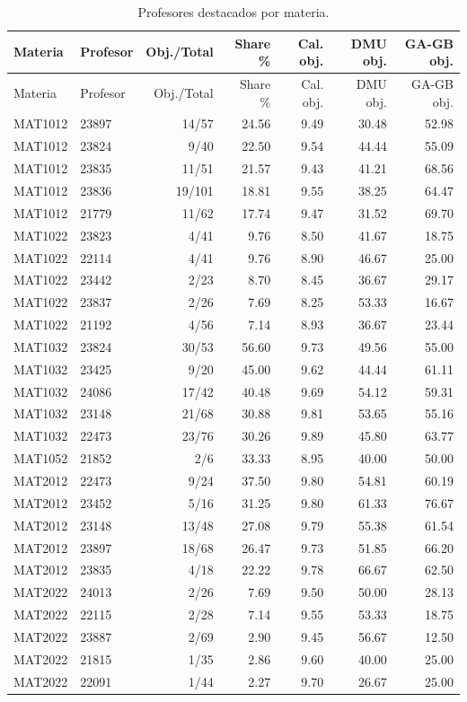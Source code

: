 \documentclass[11pt,letterpaper]{article}
\begin{document}
\begin{longtable}{llrrrrr}
\caption{Profesores destacados por materia.}\label{tab:top-profesores-materia}\\
\toprule
Materia & Profesor & Obj./Total & Share \% & Cal. obj. & DMU obj. & GA-GB obj. \\
\midrule
\endfirsthead
\toprule
Materia & Profesor & Obj./Total & Share \% & Cal. obj. & DMU obj. & GA-GB obj. \\
\midrule
\endhead
MAT1012 & 23897 & 14/57  & 24.56 & 9.49 & 30.48 & 52.98 \\
MAT1012 & 23824 & 9/40   & 22.50 & 9.54 & 44.44 & 55.09 \\
MAT1012 & 23835 & 11/51  & 21.57 & 9.43 & 41.21 & 68.56 \\
MAT1012 & 23836 & 19/101 & 18.81 & 9.55 & 38.25 & 64.47 \\
MAT1012 & 21779 & 11/62  & 17.74 & 9.47 & 31.52 & 69.70 \\
\midrule
MAT1022 & 23823 & 4/41 & 9.76 & 8.50 & 41.67 & 18.75 \\
MAT1022 & 22114 & 4/41 & 9.76 & 8.90 & 46.67 & 25.00 \\
MAT1022 & 23442 & 2/23 & 8.70 & 8.45 & 36.67 & 29.17 \\
MAT1022 & 23837 & 2/26 & 7.69 & 8.25 & 53.33 & 16.67 \\
MAT1022 & 21192 & 4/56 & 7.14 & 8.93 & 36.67 & 23.44 \\
\midrule
MAT1032 & 23824 & 30/53 & 56.60 & 9.73 & 49.56 & 55.00 \\
MAT1032 & 23425 & 9/20  & 45.00 & 9.62 & 44.44 & 61.11 \\
MAT1032 & 24086 & 17/42 & 40.48 & 9.69 & 54.12 & 59.31 \\
MAT1032 & 23148 & 21/68 & 30.88 & 9.81 & 53.65 & 55.16 \\
MAT1032 & 22473 & 23/76 & 30.26 & 9.89 & 45.80 & 63.77 \\
\midrule
MAT1052 & 21852 & 2/6 & 33.33 & 8.95 & 40.00 & 50.00 \\
\midrule
MAT2012 & 22473 & 9/24 & 37.50 & 9.80 & 54.81 & 60.19 \\
MAT2012 & 23452 & 5/16 & 31.25 & 9.80 & 61.33 & 76.67 \\
MAT2012 & 23148 & 13/48 & 27.08 & 9.79 & 55.38 & 61.54 \\
MAT2012 & 23897 & 18/68 & 26.47 & 9.73 & 51.85 & 66.20 \\
MAT2012 & 23835 & 4/18  & 22.22 & 9.78 & 66.67 & 62.50 \\
\midrule
MAT2022 & 24013 & 2/26 & 7.69 & 9.50 & 50.00 & 28.13 \\
MAT2022 & 22115 & 2/28 & 7.14 & 9.55 & 53.33 & 18.75 \\
MAT2022 & 23887 & 2/69 & 2.90 & 9.45 & 56.67 & 12.50 \\
MAT2022 & 21815 & 1/35 & 2.86 & 9.60 & 40.00 & 25.00 \\
MAT2022 & 22091 & 1/44 & 2.27 & 9.70 & 26.67 & 25.00 \\
\bottomrule
\end{longtable}
\end{document}
